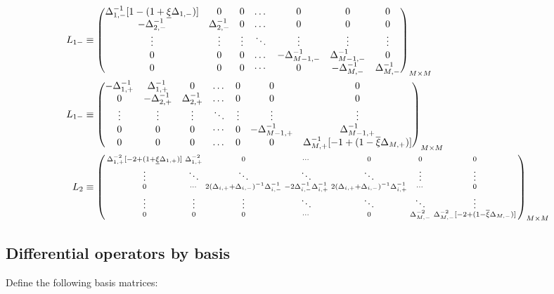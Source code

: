 \documentclass[11pt]{article}
\newenvironment{psmallmatrix}
{\left(\begin{smallmatrix}}
	{\end{smallmatrix}\right)}
\begin{document}
\begin{align}
L_{1-} &\equiv \begin{pmatrix}
\Delta^{-1}_{1,-} [1 - (1 + \underline{\xi} \Delta_{1,-})] &0&0&\dots&0&0&0\\
-\Delta_{2,-}^{-1}&\Delta_{2,-}^{-1}&0&\dots&0&0&0\\
\vdots&\vdots&\vdots&\ddots&\vdots&\vdots&\vdots\\
0&0&0&\dots&-\Delta_{M-1,-}^{-1}&\Delta_{M-1,-}^{-1}&0\\
0&0&0&\cdots&0&-\Delta_{M,-}^{-1}&\Delta_{M,-}^{-1}
\end{pmatrix}_{M\times M}\label{eq:L-1} \\
L_{1-} &\equiv \begin{pmatrix}
-\Delta_{1,+}^{-1}&\Delta_{1,+}^{-1}&0&\dots&0&0&0\\
0&-\Delta_{2,+}^{-1}&\Delta_{2,+}^{-1}&\dots&0&0&0\\
\vdots&\vdots&\vdots&\ddots&\vdots&\vdots&\vdots\\
0&0&0&\cdots&0&-\Delta_{M-1,+}^{-1}&\Delta_{M-1,+}^{-1}\\
0&0&0&\dots&0&0&\Delta_{M,+}^{-1}  [-1 + (1 - \overline{\xi} \Delta_{M,+})]  \\
\end{pmatrix}_{M\times M}\label{eq:L-1-plus} \\
L_2 &\equiv \begin{psmallmatrix}
\Delta_{1,+}^{-2}[-2 + (1+\underline{\xi} \Delta_{1,+})] &\Delta_{1,+}^{-2}&0&\cdots&0&0&0 \\
\vdots&\ddots&\ddots&\ddots&\ddots&\vdots&\vdots\\
0&\cdots&2(\Delta_{i,+}+\Delta_{i,-})^{-1} \Delta_{i,-}^{-1} &-2\Delta_{i,-}^{-1} \Delta_{i,+}^{-1}  & 2 (\Delta_{i,+}+\Delta_{i,-})^{-1} \Delta_{i,+}^{-1}&\cdots&0 \\
\vdots&\vdots&\vdots&\ddots&\ddots&\ddots&\vdots\\
0&0&0&\cdots&0&\Delta_{M,-}^{-2}&\Delta_{M,-}^{-2} [-2 + (1- \overline{\xi}\Delta_{M,-})]
\end{psmallmatrix}_{M\times M}\label{eq:L-2}
\end{align}

\subsection{Differential operators by basis}
Define the following basis matrices:
\end{document}
